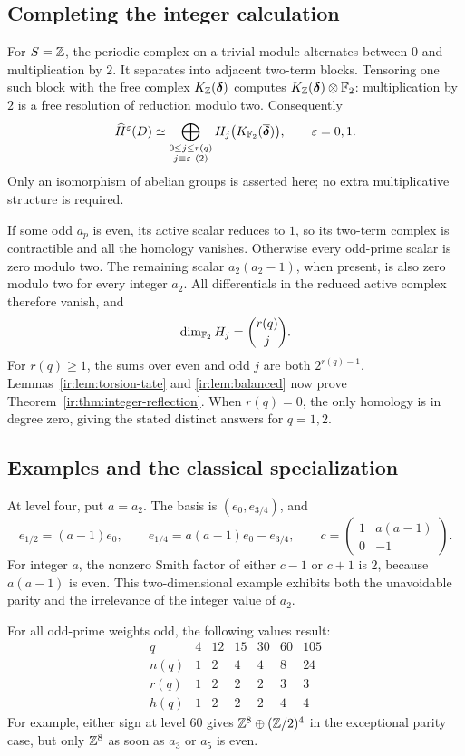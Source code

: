 \subsection{Completing the integer calculation}
For $S=\mathbb Z$, the periodic complex on a trivial module alternates
between $0$ and multiplication by $2$. It separates into adjacent
two-term blocks. Tensoring one such block with the free complex
$K_\mathbb Z(\boldsymbol\delta)$ computes
$K_\mathbb Z(\boldsymbol\delta)\otimes\mathbb F_2$: multiplication by $2$ is a
free resolution of reduction modulo two. Consequently
\begin{equation}\label{ir:eq:integer-tate-koszul}
 \widehat H^\varepsilon(D)\simeq
 \bigoplus_{\substack{0\le j\le r(q)\\j\equiv\varepsilon\ (2)}}
 H_j\bigl(K_{\mathbb F_2}(\overline{\boldsymbol\delta})\bigr),
 \qquad\varepsilon=0,1.
\end{equation}
Only an isomorphism of abelian groups is asserted here; no extra
multiplicative structure is required.

If some odd $a_p$ is even, its active scalar reduces to $1$, so its
two-term complex is contractible and all the homology vanishes.
Otherwise every odd-prime scalar is zero modulo two. The remaining
scalar $a_2(a_2-1)$, when present, is also zero modulo two for every
integer $a_2$. All differentials in the reduced active complex
therefore vanish, and
\[
 \dim_{\mathbb F_2}H_j=\binom{r(q)}j.
\]
For $r(q)\ge1$, the sums over even and odd $j$ are both
$2^{r(q)-1}$. Lemmas~\ref{ir:lem:torsion-tate} and
\ref{ir:lem:balanced} now prove
Theorem~\ref{ir:thm:integer-reflection}. When $r(q)=0$, the only
homology is in degree zero, giving the stated distinct answers for
$q=1,2$.

\subsection{Examples and the classical specialization}
At level four, put $a=a_2$. The basis is $(e_0,e_{3/4})$, and
\[
 e_{1/2}=(a-1)e_0,\qquad e_{1/4}=a(a-1)e_0-e_{3/4},
 \qquad
 c=\begin{pmatrix}1&a(a-1)\\0&-1\end{pmatrix}.
\]
For integer $a$, the nonzero Smith factor of either $c-1$ or $c+1$
is $2$, because $a(a-1)$ is even. This two-dimensional example
exhibits both the unavoidable parity and the irrelevance of the
integer value of $a_2$.

For all odd-prime weights odd, the following values result:
\[
\begin{array}{c|rrrrrr}
 q&4&12&15&30&60&105\\\hline
 n(q)&1&2&4&4&8&24\\
 r(q)&1&2&2&2&3&3\\
 h(q)&1&2&2&2&4&4
\end{array}
\]
For example, either sign at level $60$ gives
$\mathbb Z^8\oplus(\mathbb Z/2)^4$ in the exceptional parity case, but only
$\mathbb Z^8$ as soon as $a_3$ or $a_5$ is even.

